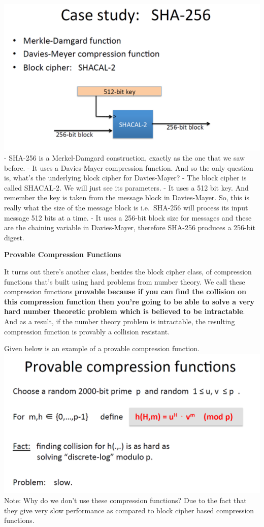 \documentclass[11pt]{article}
\makeatletter
\def\maxwidth{\ifdim\Gin@nat@width>\linewidth\linewidth
    \else\Gin@nat@width\fi}
\let\Oldincludegraphics\includegraphics
\renewcommand{\includegraphics}[1]{\Oldincludegraphics[width=.8\maxwidth]{#1}}
\makeatother
\begin{document}
\includegraphics{./Images/CaseStudy-SHA256.png} - SHA-256 is a
Merkel-Damgard construction, exactly as the one that we saw before. - It
uses a Davies-Mayer compression function. And so the only question is,
what's the underlying block cipher for Davies-Mayer? - The block cipher
is called SHACAL-2. We will just see its parameters. - It uses a 512 bit
key. And remember the key is taken from the message block in
Davies-Mayer. So, this is really what the size of the message block is
i.e.~SHA-256 will process its input message 512 bits at a time. - It
uses a 256-bit block size for messages and these are the chaining
variable in Davies-Mayer, therefore SHA-256 produces a 256-bit digest.

\textbf{Provable Compression Functions}

It turns out there's another class, besides the block cipher class, of
compression functions that's built using hard problems from number
theory. We call these compression functions \textbf{provable because if
you can find the collision on this compression function then you're
going to be able to solve a very hard number theoretic problem which is
believed to be intractable}. And as a result, if the number theory
problem is intractable, the resulting compression function is provably a
collision resistant.

Given below is an example of a provable compression function.
\includegraphics{./Images/ProvableCompressionFunc.png} Note: Why do we
don't use these compression functions? Due to the fact that they give
very slow performance as compared to block cipher based compression
functions.
\end{document}
